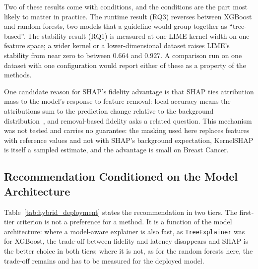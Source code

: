 \documentclass[11pt,a4paper]{article}
\begin{document}
Two of these results come with conditions, and the conditions are the part
most likely to matter in practice. The runtime result (RQ3) reverses
between XGBoost and random forests, two models that a guideline would group
together as ``tree-based''. The stability result (RQ1) is measured at one
LIME kernel width on one feature space; a wider kernel or a
lower-dimensional dataset raises LIME's stability from near zero to between
$0.664$ and $0.927$. A comparison run on one dataset with one
configuration would report either of these as a property of the methods.

One candidate reason for SHAP's fidelity advantage is that SHAP ties
attribution mass to the model's response to feature removal: local accuracy
means the attributions sum to the prediction change relative to the
background distribution~\cite{lundberg2017unified}, and removal-based
fidelity asks a related question. This mechanism was not tested and carries
no guarantee: the masking used here replaces features with reference values
and not with SHAP's background expectation, KernelSHAP is itself a sampled
estimate, and the advantage is small on Breast Cancer.

\subsection{Recommendation Conditioned on the Model Architecture}
\label{sec:recommendations}

Table~\ref{tab:hybrid_deployment} states the recommendation in two tiers.
The first-tier criterion is not a preference for a method. It is a function
of the model architecture: where a model-aware explainer is also fast, as
\texttt{TreeExplainer} was for XGBoost, the trade-off between fidelity and
latency disappears and SHAP is the better choice in both tiers; where it is
not, as for the random forests here, the trade-off remains and has to be
measured for the deployed model.
\end{document}
